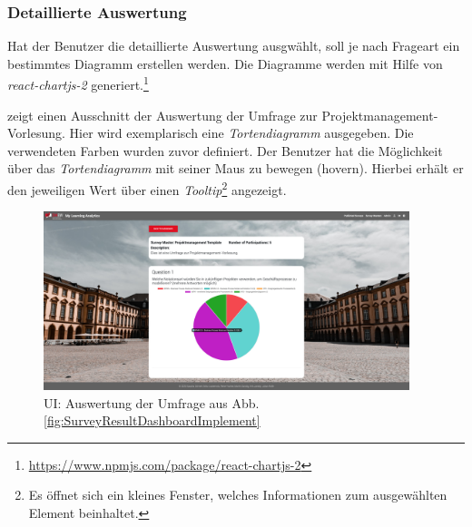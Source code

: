 \subsubsection*{Detaillierte Auswertung}
Hat der Benutzer die detaillierte Auswertung ausgwählt, soll je nach Frageart ein bestimmtes Diagramm erstellen werden. 
Die Diagramme werden mit Hilfe von \emph{react-chartjs-2} generiert.\footnote{\url{https://www.npmjs.com/package/react-chartjs-2}} 

\abb {} zeigt einen Ausschnitt der Auswertung der Umfrage zur Projektmanagement-Vorlesung. 
Hier wird exemplarisch eine \emph{Tortendiagramm} ausgegeben. 
Die verwendeten Farben wurden zuvor definiert. 
Der Benutzer hat die Möglichkeit über das \emph{Tortendiagramm} mit seiner Maus zu bewegen (hovern).
Hierbei erhält er den jeweiligen Wert über einen \emph{Tooltip}\footnote{Es öffnet sich ein kleines Fenster, welches Informationen zum ausgewählten Element beinhaltet.} angezeigt.

\begin{figure}[!htb]
	\centering
	\includegraphics[width=0.95\textwidth, keepaspectratio]{img/client/SurveyResultDetail2.png}
	\captionsetup{justification=centering, format=plain}
	\caption[\acf{UI}: Auswertung der Umfrage]{\acf{UI}: Auswertung der Umfrage aus Abb. \vref{fig:SurveyResultDashboardImplement} \\ \quelleScreenshot}
	\label{fig:SurveyResultDetailImplement}
\end{figure}
